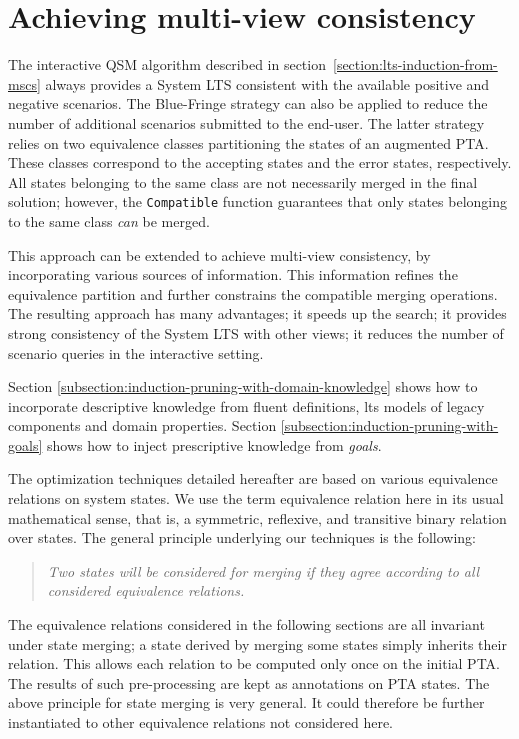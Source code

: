 \section{Achieving multi-view consistency\label{section:inductive-mutliview-consistency}}

The interactive QSM algorithm described in section~\ref{section:lts-induction-from-mscs} always provides a System LTS consistent with the available positive and negative scenarios. The Blue-Fringe strategy can also be applied to reduce the number of additional scenarios submitted to the end-user. The latter strategy relies on two equivalence classes partitioning the states of an augmented PTA. These classes correspond to the accepting states and the error states, respectively. All states belonging to the same class are not necessarily merged in the final solution; however, the \texttt{Compatible} function guarantees that only states belonging to the same class \emph{can} be merged.

This approach can be extended to achieve multi-view consistency, by incorporating various sources of information. This information refines the equivalence partition and further constrains the compatible merging operations. The resulting approach has many advantages; it speeds up the search; it provides strong consistency of the System LTS with other views; it reduces the number of scenario queries in the interactive setting.

Section \ref{subsection:induction-pruning-with-domain-knowledge} shows how to incorporate descriptive knowledge from fluent definitions, lts models of legacy components and domain properties. Section \ref{subsection:induction-pruning-with-goals} shows how to inject prescriptive knowledge from \textsl{goals}.

The optimization techniques detailed hereafter are based on various equivalence relations on system states. We use the term equivalence relation here in its usual mathematical sense, that is, a symmetric, reflexive, and transitive binary relation over states. The general principle underlying our techniques is the following:
\begin{quote}
\emph{Two states will be considered for merging if they agree according to all considered equivalence relations.}
\end{quote}
The equivalence relations considered in the following sections are all invariant under state merging; a state derived by merging some states simply inherits their relation. This allows each relation to be computed only once on the initial PTA. The results of such pre-processing are kept as annotations on PTA states. The above principle for state merging is very general. It could therefore be further instantiated to other equivalence relations not considered here.


